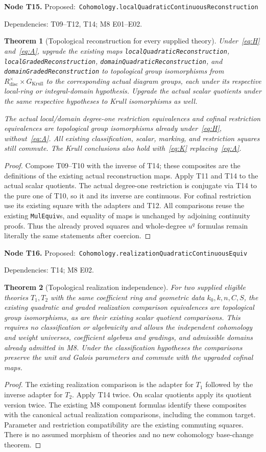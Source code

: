 \documentclass[11pt]{article}
\newtheorem{theorem}{Theorem}[section]
\theoremstyle{remark}\newtheorem{remark}[theorem]{Remark}
\newcommand{\code}[1]{{\normalfont\nolinkurl{#1}}}
\newcommand{\node}[3]{\par\Needspace{8\baselineskip}\smallskip\noindent\textbf{Node #1.}\quad
 \textsf{Proposed:}\ \code{#2}\par\noindent
 \textsf{Dependencies:} #3.\par\smallskip}
\begin{document}
\node{T15}{Cohomology.localQuadraticContinuousReconstruction}{T09--T12, T14; M8 E01--E02}
\begin{theorem}[Topological reconstruction for every supplied theory]\label{thm:t15}
Under~\eqref{eq:H} and~\eqref{eq:A}, upgrade the existing maps
\code{localQuadraticReconstruction}, \code{localGradedReconstruction},
\code{domainQuadraticReconstruction}, and
\code{domainGradedReconstruction} to topological group
isomorphisms from $R^\times_{\mathrm{disc}}\times G_{\mathrm{Krull}}$
to the corresponding actual diagram groups, each under its respective
local-ring or integral-domain hypothesis. Upgrade the actual scalar
quotients under the same respective hypotheses to Krull isomorphisms
as well.

The actual local/domain degree-one restriction equivalences and
cofinal restriction equivalences are topological group isomorphisms
already under~\eqref{eq:H}, without~\eqref{eq:A}. All existing
classification, scalar, marking, and restriction squares still commute.
The Krull conclusions also hold with~\eqref{eq:K} replacing~\eqref{eq:A}.
\end{theorem}
\begin{proof}
Compose T09--T10 with the inverse of T14; these composites are the
definitions of the existing actual reconstruction maps. Apply T11
and T14 to the actual scalar quotients. The actual degree-one
restriction is conjugate via T14 to the pure one of T10, so it and
its inverse are continuous. For cofinal restriction use its existing
square with the adapters and T12. All comparisons reuse the existing
\code{MulEquiv}s, and equality of maps is unchanged by adjoining
continuity proofs. Thus the already proved squares and whole-degree
$u^q$ formulas remain literally the same statements after coercion.
\end{proof}

\node{T16}{Cohomology.realizationQuadraticContinuousEquiv}{T14; M8 E02}
\begin{theorem}[Topological realization independence]\label{thm:t16}
For two supplied eligible theories $T_1,T_2$ with the same coefficient
ring and geometric data $k_0,k,n,C,S$, the existing quadratic and graded realization
comparison equivalences are topological group isomorphisms, as are
their existing scalar quotient comparisons. This requires no
classification or algebraicity and allows the independent cohomology
and weight universes, coefficient algebras and gradings, and admissible
domains already admitted in M8. Under the classification
hypotheses the comparisons preserve the unit and Galois parameters
and commute with the upgraded cofinal maps.
\end{theorem}
\begin{proof}
The existing realization comparison is the adapter for $T_1$ followed
by the inverse adapter for $T_2$. Apply T14 twice. On scalar quotients
apply its quotient version twice. The existing M8 component formulas
identify these composites with the canonical actual realization
comparisons, including the common target. Parameter and restriction
compatibility are the existing commuting squares. There is no assumed
morphism of theories and no new cohomology base-change theorem.
\end{proof}
\end{document}
